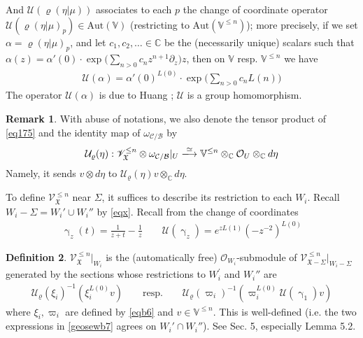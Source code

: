 \documentclass[11pt,b5paper,notitlepage]{article}
\theoremstyle{definition}
\newtheorem{df}{Definition}[section]
\newtheorem{rem}[df]{Remark}
\theoremstyle{plain}
\newcommand{\fk}{\mathfrak}
\newcommand{\mc}{\mathcal}
\newcommand{\SV}{\mathscr{V}}
\newcommand{\scr}{\mathscr}
\newcommand{\Vbb}{\mathbb V}
\newcommand{\Cbb}{\mathbb C}
\newcommand{\<}{\left\langle}
\renewcommand{\>}{\right\rangle}
\newcommand{\MO}{\mathcal{O}}
\newcommand{\MU}{\mathcal{U}}
\newcommand{\fx}{\mathfrak{X}}
\numberwithin{equation}{section}
\begin{document}
And $\mc U(\varrho(\eta|\mu))$ associates to each $p$ the change of coordinate operator $\mc U(\varrho(\eta|\mu)_p)\in\mathrm{Aut}(\Vbb)$ (restricting to $\mathrm{Aut}(\Vbb^{\leq n})$); more precisely, if we set $\alpha=\varrho(\eta|\mu)_p$, and let $c_1,c_2,\dots\in\Cbb$ be the (necessarily unique) scalars such that $\alpha(z)=\alpha'(0)\cdot\exp\Big(\sum_{n>0}c_nz^{n+1}\partial_z\Big)z$, then on $\Vbb$ resp. $\Vbb^{\leq n}$ we have
\begin{align}
\mc U(\alpha)=\alpha'(0)^{L(0)}\cdot\exp\Big(\sum_{n>0}c_nL(n)\Big)
\end{align}
The operator $\mc U(\alpha)$ is due to Huang \cite{Hua97}; $\mc U$ is a group homomorphism.

\begin{rem}
With abuse of notations, we also denote the tensor product of \eqref{eq175} and the identity map of $\omega_{\mc C/\mc B}$ by
\begin{align}\label{eqb43}
\mc U_\varrho(\eta):\scr V^{\leq n}_\fx\otimes \omega_{\mc C/\mc B}|_U\xlongrightarrow{\simeq}\Vbb^{\leq n}\otimes_\Cbb\mc O_U\otimes_\Cbb d\eta
\end{align}
Namely, it sends $v\otimes d\eta$ to $\mc U_\varrho(\eta)v\otimes_\Cbb d\eta$.
\end{rem}

To define $\scr V_{\fk X}^{\leq n}$ near $\Sigma$, it suffices to describe its restriction to each $W_i$. Recall $W_i-\Sigma=W_i'\cup W_i''$ by \eqref{eqx}. Recall from \cite[Sec. 1.3]{GZ1} the change of coordinates
\begin{gather}\label{eqb87}
\upgamma_z(t)=\frac 1{z+t}-\frac 1z\qquad \mc U(\upgamma_z)=e^{zL(1)}(-z^{-2})^{L(0)}
\end{gather}



\begin{df}\label{lbb45}
$\scr V_{\fk X}^{\leq n}|_{W_i}$ is the (automatically free) $\MO_{W_i}$-submodule of $\SV_{\fx-\Sigma}^{\leq n}\vert_{W_i-\Sigma}$ generated by the sections whose restrictions to $W_i^\prime$ and $W_i''$ are 
\begin{align}\label{geosewb7}
    \MU_\varrho(\xi_i)^{-1}(\xi_i^{L(0)}v) \qquad \text{resp.}\qquad \MU_\varrho(\varpi_i)^{-1}(\varpi_i^{L(0)}\MU(\upgamma_1)v)
\end{align}
where $\xi_i,\varpi_i$ are defined by \eqref{eqb6} and $v\in \Vbb^{\leq n}$. This is well-defined (i.e. the two expressions in \eqref{geosewb7} agrees on $W_i'\cap W_i''$). See \cite{Gui-sewingconvergence} Sec. 5, especially Lemma 5.2. 
\end{df}
\end{document}
